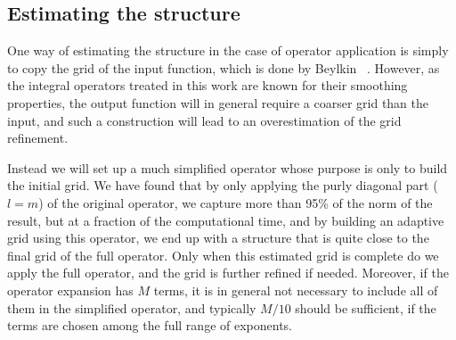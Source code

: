 \subsection{Estimating the \tree structure}
One way of estimating the \tree structure in the case of operator application 
is simply to copy the grid of the input function, which is done by Beylkin 
\etal~\cite{Beylkin:2008p37}. However, as the integral
operators treated in this work are known for their smoothing properties, the
output function will in general require a coarser grid than the input, and such
a construction will lead to an overestimation of the grid refinement. 

Instead we 
will set up a much simplified operator whose purpose is only to build the initial 
grid. We have found that by only applying the purly diagonal part ($l = m$) 
of the original operator, we capture more than 95\% of the norm of the result, 
but at a fraction of the computational time, and by building an adaptive grid using
this operator, we end up with a \tree structure that is quite close to the final 
grid of the full operator. Only when this estimated grid is complete do we apply the
full operator, and the grid is further refined if needed. Moreover, if the operator
expansion has $M$ terms, it is in general not necessary to include all of
them in the simplified operator, and typically $M/10$ should be sufficient,
if the terms are chosen among the full range of exponents.
